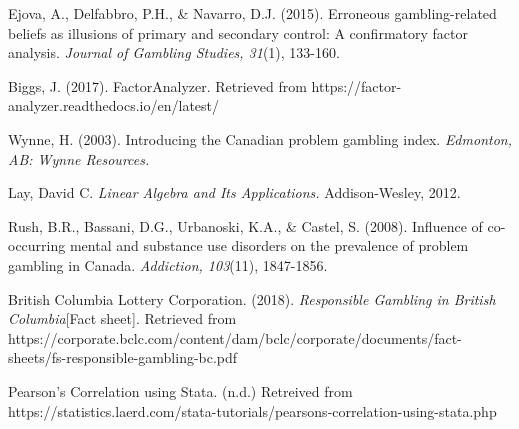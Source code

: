 \documentclass[twoside,twocolumn]{article}
\begin{document}
\begin{thebibliography}{99}
  Ejova, A., Delfabbro, P.H., \& Navarro, D.J. (2015). Erroneous gambling-related beliefs as illusions of primary and secondary control: A confirmatory factor analysis. \emph{Journal of Gambling Studies, 31}(1), 133-160.

  Biggs, J. (2017). FactorAnalyzer. Retrieved from https://factor-analyzer.readthedocs.io/en/latest/

  Wynne, H. (2003). Introducing the Canadian problem gambling index. \emph{Edmonton, AB: Wynne Resources.}

  Lay, David C. \emph{Linear Algebra and Its Applications.} Addison-Wesley, 2012.

  Rush, B.R., Bassani, D.G., Urbanoski, K.A., \& Castel, S. (2008). Influence of co-occurring mental and substance use disorders on the prevalence of problem gambling in Canada. \emph{Addiction, 103}(11), 1847-1856.

  British Columbia Lottery Corporation. (2018). \emph{Responsible Gambling in British Columbia}[Fact sheet]. Retrieved from https://corporate.bclc.com/content/dam/bclc/corporate/documents/fact-sheets/fs-responsible-gambling-bc.pdf

  Pearson's Correlation using Stata. (n.d.) Retreived from https://statistics.laerd.com/stata-tutorials/pearsons-correlation-using-stata.php

\end{thebibliography}

\end{document}

